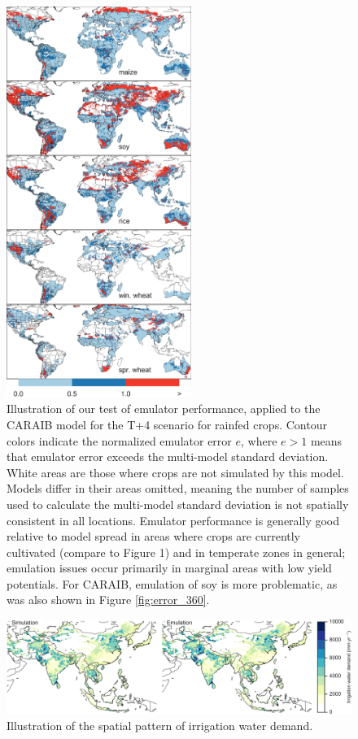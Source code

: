 \documentclass[gmd, manuscript]{copernicus} %
\begin{document}
\begin{figure}[ht]
\centering
    \includegraphics[width=6cm]{figures/em_err.png}
    \caption{Illustration of our test of emulator performance, applied to the CARAIB model for the T+4 scenario for rainfed crops. 
    Contour colors indicate the normalized emulator error $e$, where $e > 1$ means that emulator error exceeds the multi-model standard deviation. 
    White areas are those where crops are not simulated by this model. 
    Models differ in their areas omitted, meaning the number of samples used to calculate the multi-model standard deviation is not spatially consistent in all locations. 
    Emulator performance is generally good relative to model spread in areas where crops are currently cultivated (compare to Figure 1) and in temperate zones in general; emulation issues occur primarily in marginal areas with low yield potentials. 
    For CARAIB, emulation of soy is more problematic, as was also shown in Figure \ref{fig:error_360}.}
   \label{fig:error}
\end{figure}

\begin{figure}[ht]
\centering
    \includegraphics[width=16cm]{figures/irr_emulator_skill.png}
    \caption{Illustration of the spatial pattern of irrigation water demand.}
   \label{fig:error}
\end{figure}
\end{document}
